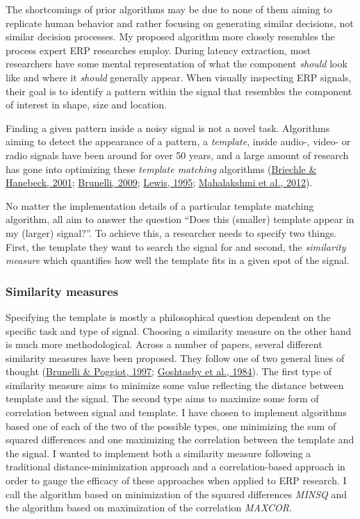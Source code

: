 \documentclass[
  man]{apa7}
\begin{document}
The shortcomings of prior algorithms may be due to none of them aiming to replicate human behavior and rather focusing on generating similar decisions, not similar decision processes. My proposed algorithm more closely resembles the process expert ERP researches employ. During latency extraction, most researchers have some mental representation of what the component \emph{should} look like and where it \emph{should} generally appear. When visually inspecting ERP signals, their goal is to identify a pattern within the signal that resembles the component of interest in shape, size and location.

Finding a given pattern inside a noisy signal is not a novel task. Algorithms aiming to detect the appearance of a pattern, a \emph{template}, inside audio-, video- or radio signals have been around for over 50 years, and a large amount of research has gone into optimizing these \emph{template matching} algorithms (\protect\hyperlink{ref-briechle2001template}{Briechle \& Hanebeck, 2001}; \protect\hyperlink{ref-brunelli2009template}{Brunelli, 2009}; \protect\hyperlink{ref-lewis1995fast}{Lewis, 1995}; \protect\hyperlink{ref-mahalakshmi2012image}{Mahalakshmi et al., 2012}).

No matter the implementation details of a particular template matching algorithm, all aim to answer the question ``Does this (smaller) template appear in my (larger) signal?''. To achieve this, a researcher needs to specify two things. First, the template they want to search the signal for and second, the \emph{similarity measure} which quantifies how well the template fits in a given spot of the signal.

\hypertarget{similarity-measures}{%
\subsubsection{Similarity measures}\label{similarity-measures}}

Specifying the template is mostly a philosophical question dependent on the specific task and type of signal. Choosing a similarity measure on the other hand is much more methodological. Across a number of papers, several different similarity measures have been proposed. They follow one of two general lines of thought (\protect\hyperlink{ref-brunelli1997template}{Brunelli \& Poggiot, 1997}; \protect\hyperlink{ref-goshtasby1984two}{Goshtasby et al., 1984}). The first type of similarity measure aims to minimize some value reflecting the distance between template and the signal. The second type aims to maximize some form of correlation between signal and template. I have chosen to implement algorithms based one of each of the two of the possible types, one minimizing the sum of squared differences and one maximizing the correlation between the template and the signal. I wanted to implement both a similarity measure following a traditional distance-minimization approach and a correlation-based approach in order to gauge the efficacy of these approaches when applied to ERP research. I call the algorithm based on minimization of the squared differences \emph{MINSQ} and the algorithm based on maximization of the correlation \emph{MAXCOR}.
\end{document}
